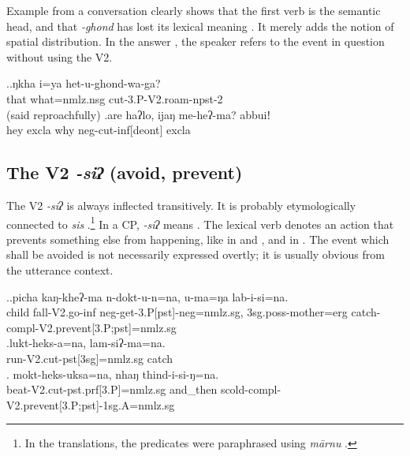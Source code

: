 Example \Next from a conversation clearly shows that the first verb is the semantic head, and that \emph{-ghond} has lost its lexical meaning . It  merely adds the notion of spatial distribution. In the answer \Next[b], the speaker refers to the event in question without using the V2. 

\ex.\ag.ŋkha i=ya                het-u-ghond-wa-ga?\\
that what{\sc =nmlz.nsg} cut{\sc -3.P-V2.roam-npst-2}\\
 (said reproachfully) 
\bg.are    haʔlo, ijaŋ me-heʔ-ma?    abbuiǃ\\
hey {\sc excla} why {\sc neg-}cut{\sc -inf[deont]} {\sc excla}\\
  

	

\subsection{The V2 \emph{-siʔ} (avoid, prevent)}\label{V2-avoid}
	
The V2 \emph{-siʔ} is always inflected transitively. It is probably etymologically connected to \emph{sis}  .\footnote{In the  translations, the  predicates were paraphrased using \emph{mārnu} .} In a CP,  \emph{-siʔ} means . The lexical verb denotes an action that prevents something else from happening, like  in \Next[a] and \Next[b], and  in \Next[c].  The event which shall be avoided is not necessarily expressed overtly; it is usually obvious from the utterance context.
	
\ex.\ag.picha kaŋ-kheʔ-ma n-dokt-u-n=na, u-ma=ŋa lab-i-si=na.\\
child fall{\sc -V2.go-inf} {\sc neg-}get{\sc -3.P[pst]-neg=nmlz.sg},  {\sc 3sg.poss-}mother{\sc =erg} catch{\sc -compl-V2.prevent[3.P;pst]=nmlz.sg}\\
\bg.lukt-heks-a=na, lam-siʔ-ma=na.\\
run{\sc -V2.cut-pst[3sg]=nmlz.sg} catch\\
\bg. mokt-heks-uksa=na, nhaŋ thind-i-si-ŋ=na.\\
beat{\sc -V2.cut-pst.prf[3.P]=nmlz.sg} and\_then scold{\sc -compl-V2.prevent[3.P;pst]-1sg.A=nmlz.sg}\\



